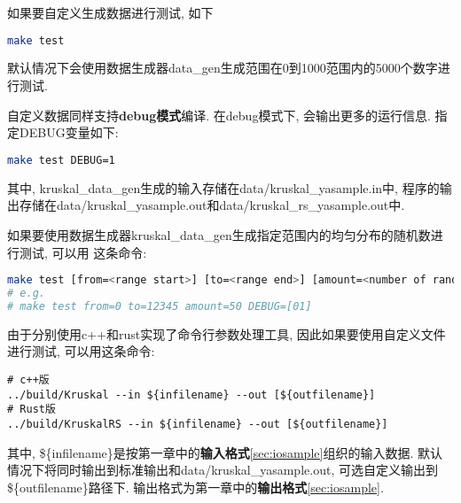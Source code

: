 如果要自定义生成数据进行测试, 如下
\begin{lstlisting}[language=bash]
make test
\end{lstlisting}
默认情况下会使用数据生成器data\_gen生成范围在0到1000范围内的5000个数字进行测试.\par

自定义数据同样支持\textbf{debug模式}编译. 在debug模式下, 会输出更多的运行信息.
指定DEBUG变量如下:
\begin{lstlisting}[language=bash]
make test DEBUG=1
\end{lstlisting}

其中, kruskal\_data\_gen生成的输入存储在data/kruskal\_yasample.in中,
程序的输出存储在data/kruskal\_yasample.out和data/kruskal\_rs\_yasample.out中. \par

如果要使用数据生成器kruskal\_data\_gen生成指定范围内的均匀分布的随机数进行测试, 可以用
这条命令:
\begin{lstlisting}[language=bash]
make test [from=<range start>] [to=<range end>] [amount=<number of random numbers>]
# e.g. 
# make test from=0 to=12345 amount=50 DEBUG=[01]
\end{lstlisting}

由于分别使用c++和rust实现了命令行参数处理工具, 因此如果要使用自定义文件进行测试,
可以用这条命令:
\begin{lstlisting}
# c++版
../build/Kruskal --in ${infilename} --out [${outfilename}]
# Rust版
../build/KruskalRS --in ${infilename} --out [${outfilename}]
\end{lstlisting}
其中, \$\{infilename\}是按第一章中的\textbf{输入格式}\ref{sec:iosample}组织的输入数据.
默认情况下将同时输出到标准输出和data/kruskal_yasample.out, 可选自定义输出到
\$\{outfilename\}路径下. 输出格式为第一章中的\textbf{输出格式}\ref{sec:iosample}.


